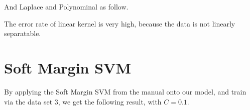 \documentclass[12pt]{article}
\begin{document}
\begin{figure}[h]
\centering
{}
\end{figure}

\newpage

And Laplace and Polynominal as follow.



The error rate of linear kernel is very high, because the data is not linearly separatable.

\section{Soft Margin SVM}

\qquad By applying the Soft Margin SVM from the manual onto our model, and train via the data set 3, we get the following result, with $C = 0.1$.

\begin{figure}[h]
\centering
{}
\end{figure}
\end{document}
